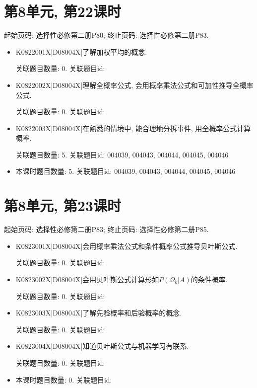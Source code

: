 \section*{第8单元, 第22课时}
起始页码: 选择性必修第二册P80; 终止页码: 选择性必修第二册P83.
\begin{itemize}
\item K0822001X|D08004X|了解加权平均的概念.

关联题目数量: 0. 关联题目id: 

\item K0822002X|D08004X|理解全概率公式, 会用概率乘法公式和可加性推导全概率公式.

关联题目数量: 0. 关联题目id: 

\item K0822003X|D08004X|在熟悉的情境中, 能合理地分拆事件, 用全概率公式计算概率.

关联题目数量: 5. 关联题目id: 004039, 004043, 004044, 004045, 004046

\item 本课时题目数量: 5. 关联题目id: 004039, 004043, 004044, 004045, 004046

\end{itemize}

\section*{第8单元, 第23课时}
起始页码: 选择性必修第二册P83; 终止页码: 选择性必修第二册P85.
\begin{itemize}
\item K0823001X|D08004X|会用概率乘法公式和条件概率公式推导贝叶斯公式.

关联题目数量: 0. 关联题目id: 

\item K0823002X|D08004X|会用贝叶斯公式计算形如$P(\Omega_k|A)$的条件概率.

关联题目数量: 0. 关联题目id: 

\item K0823003X|D08004X|了解先验概率和后验概率的概念.

关联题目数量: 0. 关联题目id: 

\item K0823004X|D08004X|知道贝叶斯公式与机器学习有联系.

关联题目数量: 0. 关联题目id: 

\item 本课时题目数量: 0. 关联题目id: 

\end{itemize}

